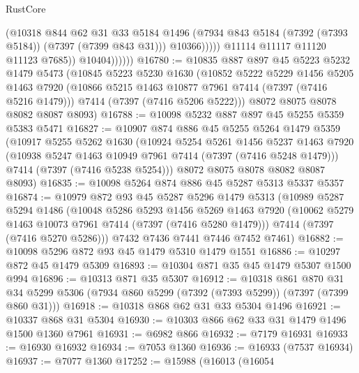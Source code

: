 \begin{lexlean}{RustCore}
\begin{coremodule}
                            (@10318
                              @844
                              @62
                              @31
                              @33
                              @5184
                              @1496
                              (@7934 @843 @5184 (@7392 (@7393 @5184)) (@7397 (@7399 @843 @31)))
                              @10366)))))
                    @11114
                    @11117
                    @11120
                    @11123
                    @7685))
                @10404))))))
@16780 := @10835
    @887
    @897
    @45
    @5223
    @5232
    @1479
    @5473
    (@10845
      @5223
      @5230
      @1630
      (@10852
        @5222
        @5229
        @1456
        @5205
        @1463
        @7920
        (@10866 @5215 @1463 @10877 @7961 @7414 (@7397 (@7416 @5216 @1479)))
        @7414
        (@7397 (@7416 @5206 @5222)))
      @8072
      @8075
      @8078
      @8082
      @8087
      @8093)
@16788 := @10098 @5232 @887 @897 @45 @5255 @5359 @5383 @5471
@16827 := @10907
    @874
    @886
    @45
    @5255
    @5264
    @1479
    @5359
    (@10917
      @5255
      @5262
      @1630
      (@10924
        @5254
        @5261
        @1456
        @5237
        @1463
        @7920
        (@10938 @5247 @1463 @10949 @7961 @7414 (@7397 (@7416 @5248 @1479)))
        @7414
        (@7397 (@7416 @5238 @5254)))
      @8072
      @8075
      @8078
      @8082
      @8087
      @8093)
@16835 := @10098 @5264 @874 @886 @45 @5287 @5313 @5337 @5357
@16874 := @10979
    @872
    @93
    @45
    @5287
    @5296
    @1479
    @5313
    (@10989
      @5287
      @5294
      @1486
      (@10048
        @5286
        @5293
        @1456
        @5269
        @1463
        @7920
        (@10062 @5279 @1463 @10073 @7961 @7414 (@7397 (@7416 @5280 @1479)))
        @7414
        (@7397 (@7416 @5270 @5286)))
      @7432
      @7436
      @7441
      @7446
      @7452
      @7461)
@16882 := @10098 @5296 @872 @93 @45 @1479 @5310 @1479 @1551
@16886 := @10297 @872 @45 @1479 @5309
@16893 := @10304 @871 @35 @45 @1479 @5307 @1500 @994
@16896 := @10313 @871 @35 @5307
@16912 := @10318
    @861
    @870
    @31
    @34
    @5299
    @5306
    (@7934 @860 @5299 (@7392 (@7393 @5299)) (@7397 (@7399 @860 @31)))
@16918 := @10318 @868 @62 @31 @33 @5304 @1496
@16921 := @10337 @868 @31 @5304
@16930 := @10303 @866 @62 @33 @31 @1479 @1496 @1500 @1360 @7961
@16931 := @6982 @866
@16932 := @7179 @16931
@16933 := @16930 @16932
@16934 := @7053 @1360
@16936 := @16933 (@7537 @16934)
@16937 := @7077 @1360
@17252 := @15988
    (@16013
      (@16054

\end{coremodule}
\end{lexlean}
